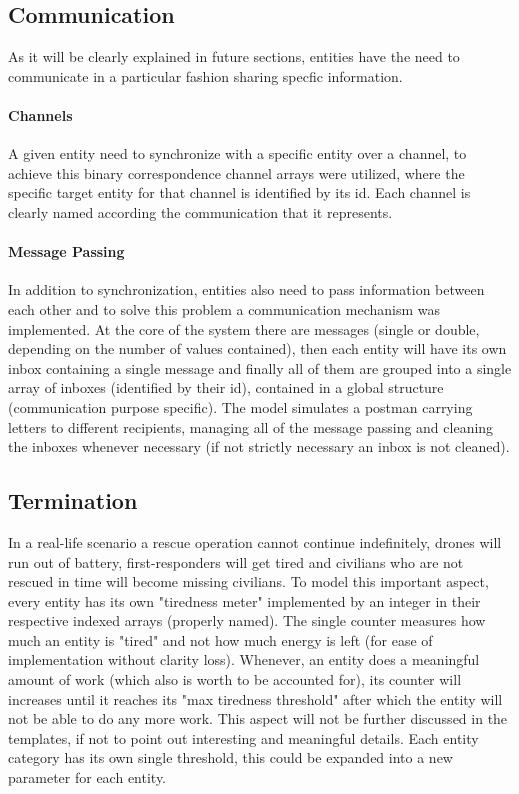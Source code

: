 \subsection{Communication}
As it will be clearly explained in future sections, entities have the need to communicate in a particular fashion sharing specfic information.
\paragraph{Channels}
A given entity need to synchronize with a specific entity over a channel, to achieve this binary correspondence channel arrays were utilized, where the specific target entity for that channel is identified by its id. Each channel is clearly named according the communication that it represents.
\paragraph{Message Passing}
In addition to synchronization, entities also need to pass information between each other and to solve this problem a communication mechanism was implemented. At the core of the system there are messages (single or double, depending on the number of values contained), then each entity will have its own inbox containing a single message and finally all of them are grouped into a single array of inboxes (identified by their id), contained in a global structure (communication purpose specific). The model simulates a postman carrying letters to different recipients, managing all of the message passing and cleaning the inboxes whenever necessary (if not strictly necessary an inbox is not cleaned).


\subsection{Termination}
In a real-life scenario a rescue operation cannot continue indefinitely, drones will run out of battery, first-responders will get tired and civilians who are not rescued in time will become missing civilians. To model this important aspect, every entity has its own "tiredness meter" implemented by an integer in their respective indexed arrays (properly named). The single counter measures how much an entity is "tired" and not how much energy is left (for ease of implementation without clarity loss). Whenever, an entity does a meaningful amount of work (which also is worth to be accounted for), its counter will increases until it reaches its "max tiredness threshold" after which the entity will not be able to do any more work. This aspect will not be further discussed in the templates, if not to point out interesting and meaningful details. Each entity category has its own single threshold, this could be expanded into a new parameter for each entity.


